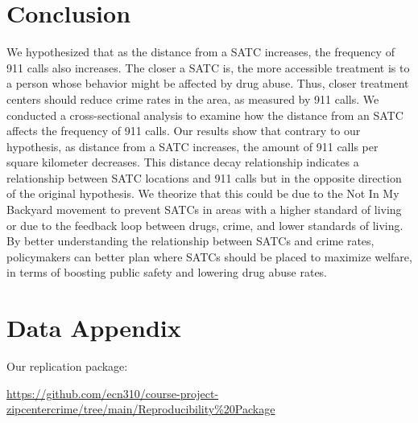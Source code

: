\documentclass[12pt]{article}
\begin{document}
\section{Conclusion}
\label{sec:conclusion}


We hypothesized that as the distance from a SATC increases, the frequency of 911 calls also increases. The closer a SATC is, the more accessible treatment is to a person whose behavior might be affected by drug abuse. Thus, closer treatment centers should reduce crime rates in the area, as measured by 911 calls. We conducted a cross-sectional analysis to examine how the distance from an SATC affects the frequency of 911 calls. Our results show that contrary to our hypothesis, as distance from a SATC increases, the amount of 911 calls per square kilometer decreases. This distance decay relationship indicates a relationship between SATC locations and 911 calls but in the opposite direction of the original hypothesis. We theorize that this could be due to the Not In My Backyard movement to prevent SATCs in areas with a higher standard of living or due to the feedback loop between drugs, crime, and lower standards of living. By better understanding the relationship between SATCs and crime rates, policymakers can better plan where SATCs should be placed to maximize welfare, in terms of boosting public safety and lowering drug abuse rates. 


 

\newpage
\singlespacing
\setlength\bibsep{0pt}





\newpage
\section*{Data Appendix} \label{sec:appendixa}

Our replication package:

\href{https://github.com/ecn310/course-project-zipcentercrime/tree/main/Reproducibility%20Package}{https://github.com/ecn310/course-project-zipcentercrime/tree/main/Reproducibility\%20Package}

\vspace{10pt}
\end{document}
